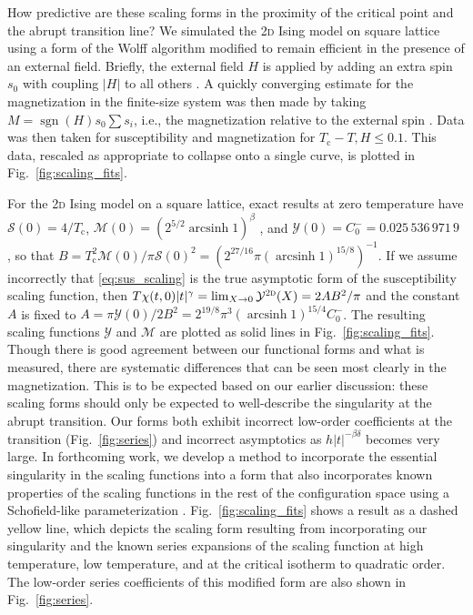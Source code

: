 \documentclass[aps,prl,reprint]{revtex4-1}
\def\arcsinh{\mathop{\mathrm{arcsinh}}\nolimits}
\def\sgn{\mathop{\mathrm{sgn}}\nolimits}
\def\c{\mathrm c}
\def\fM{\mathcal M}  %
\def\fX{\mathcal Y}  %
\def\fS{\mathcal S}  %
\def\twodee{\textsc{2d} }
\begin{document}
How predictive are these scaling forms in the proximity of the critical point
and the abrupt transition line? We simulated the \twodee Ising model on square
lattice using a form of the Wolff algorithm modified to remain efficient in
the presence of an external field. Briefly, the external field $H$ is applied
by adding an extra spin $s_0$ with coupling $|H|$ to all others
\cite{dimitrovic.1991.finite}. A quickly converging estimate for the
magnetization in the finite-size system was then made by taking
$M=\sgn(H)s_0\sum s_i$, i.e., the magnetization relative to the external spin
\cite{kent-dobias.2018.wolff}.
Data was then taken for susceptibility and magnetization for
$T_\c-T,H\leq0.1$. This data, rescaled as appropriate to collapse onto a
single curve, is plotted in Fig.~\ref{fig:scaling_fits}.

For the \twodee Ising model on a square lattice, exact results at zero
temperature have $\fS(0)=4/T_\c$, $\fM(0)=(2^{5/2}\arcsinh1)^\beta$
\cite{onsager.1944.crystal}, and $\fX(0)=C_0^-=0.025\,536\,971\,9$ \cite{barouch.1973.susceptibility}, so that
$B=T_\c^2\fM(0)/\pi\fS(0)^2=(2^{27/16}\pi(\arcsinh1)^{15/8})^{-1}$. If we
assume incorrectly that \eqref{eq:sus_scaling} is the true asymptotic form of
the susceptibility scaling function, then
$T\chi(t,0)|t|^\gamma=\lim_{X\to0}\fX^\twodee(X)=2AB^2/\pi$ and the constant
$A$ is fixed to $A=\pi\fX(0)/2B^2=2^{19/8}\pi^3(\arcsinh1)^{15/4}C_0^-$.  The
resulting scaling functions $\fX$ and $\fM$ are plotted as solid lines in
Fig.~\ref{fig:scaling_fits}. Though there is good agreement
between our functional forms and what is measured, there
are systematic differences that can be seen most clearly in the
magnetization. This is to be expected based on our earlier discussion: these
scaling forms should only be expected to well-describe the singularity at the
abrupt transition. Our forms both exhibit incorrect low-order
coefficients at the transition (Fig.~\ref{fig:series}) and incorrect
asymptotics as $h|t|^{-\beta\delta}$ becomes very large. In forthcoming work,
we develop a method to incorporate the essential singularity in the scaling
functions into a form that also incorporates known properties of the scaling
functions in the rest of the configuration space using a Schofield-like
parameterization \cite{kent-dobias.2018.parametric}. Fig.~\ref{fig:scaling_fits} shows a result as a
dashed yellow line, which depicts the scaling form resulting from
incorporating our singularity and the known series expansions of the scaling
function at high temperature, low temperature, and at the critical isotherm to
quadratic order. The low-order series coefficients of this modified form are
also shown in Fig.~\ref{fig:series}.
\end{document}
